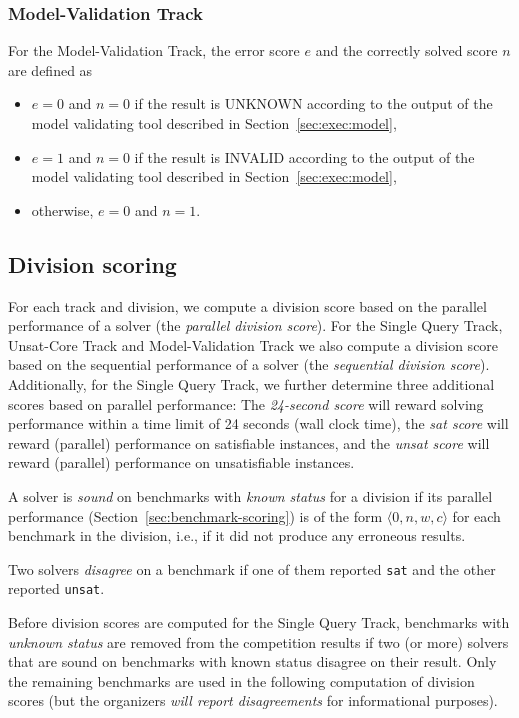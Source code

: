 \documentclass[12pt]{article}
\newcommand{\maintrack}{Single Query Track\xspace}
\newcommand{\ucoretrack}{Unsat-Core Track\xspace}
\newcommand{\mvaltrack}{Model-Validation Track\xspace}
\begin{document}
\subsubsection{\mvaltrack}
  For the \mvaltrack, the error score $e$ and the correctly solved score $n$
  are defined as
  \begin{itemize}
  \item $e=0$ and $n=0$ if the result is UNKNOWN according to the output of
    the model validating tool described in Section~\ref{sec:exec:model},
  \item $e=1$ and $n=0$ if the result is INVALID according to the output of
    the model validating tool described in Section~\ref{sec:exec:model},
  \item otherwise, $e=0$ and $n=1$.
  \end{itemize}

\subsection{Division scoring}
\label{sec:division-scoring}

For each track and division, we compute a division score based on the parallel
performance of a solver (the \emph{parallel division score}).  For the
\maintrack, \ucoretrack and \mvaltrack we also compute a division
score based on the sequential performance of a solver (the \emph{sequential
division score}).  Additionally, for the \maintrack, we further determine three
additional scores based on parallel performance: The \emph{24-second score}
will reward solving performance within a time limit of 24 seconds (wall clock
time), the \emph{sat score} will reward (parallel) performance on satisfiable
instances, and the \emph{unsat score} will reward (parallel) performance on
unsatisfiable instances.

A solver is \emph{sound} on benchmarks with \emph{known status} for a division
if its parallel performance (Section~\ref{sec:benchmark-scoring}) is of the
form $\langle 0, n, w, c\rangle$ for each benchmark in the division, i.e., if
it did not produce any erroneous results.

Two solvers \emph{disagree} on a benchmark if one of them reported \texttt{sat}
and the other reported \texttt{unsat}.

Before division scores are computed for the \maintrack{},
benchmarks with \emph{unknown status} are removed from the competition results
if two (or more) solvers that are sound on benchmarks with known status
disagree on their result.
%
Only the remaining benchmarks are used in the following computation of division
scores (but the organizers \emph{will report disagreements} for informational
purposes).
\end{document}
